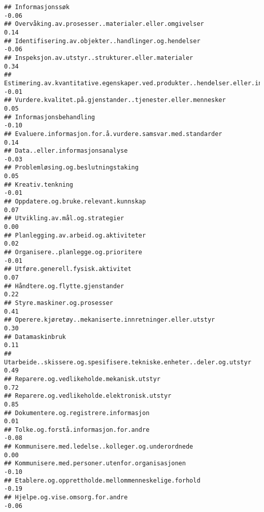 \documentclass[
]{article}
\begin{document}
\begin{verbatim}
## Informasjonssøk                                                                  -0.06
## Overvåking.av.prosesser..materialer.eller.omgivelser                              0.14
## Identifisering.av.objekter..handlinger.og.hendelser                              -0.06
## Inspeksjon.av.utstyr..strukturer.eller.materialer                                 0.34
## Estimering.av.kvantitative.egenskaper.ved.produkter..hendelser.eller.informasjon -0.01
## Vurdere.kvalitet.på.gjenstander..tjenester.eller.mennesker                        0.05
## Informasjonsbehandling                                                           -0.10
## Evaluere.informasjon.for.å.vurdere.samsvar.med.standarder                         0.14
## Data..eller.informasjonsanalyse                                                  -0.03
## Problemløsing.og.beslutningstaking                                                0.05
## Kreativ.tenkning                                                                 -0.01
## Oppdatere.og.bruke.relevant.kunnskap                                              0.07
## Utvikling.av.mål.og.strategier                                                    0.00
## Planlegging.av.arbeid.og.aktiviteter                                              0.02
## Organisere..planlegge.og.prioritere                                              -0.01
## Utføre.generell.fysisk.aktivitet                                                  0.07
## Håndtere.og.flytte.gjenstander                                                    0.22
## Styre.maskiner.og.prosesser                                                       0.41
## Operere.kjøretøy..mekaniserte.innretninger.eller.utstyr                           0.30
## Datamaskinbruk                                                                    0.11
## Utarbeide..skissere.og.spesifisere.tekniske.enheter..deler.og.utstyr              0.49
## Reparere.og.vedlikeholde.mekanisk.utstyr                                          0.72
## Reparere.og.vedlikeholde.elektronisk.utstyr                                       0.85
## Dokumentere.og.registrere.informasjon                                             0.01
## Tolke.og.forstå.informasjon.for.andre                                            -0.08
## Kommunisere.med.ledelse..kolleger.og.underordnede                                 0.00
## Kommunisere.med.personer.utenfor.organisasjonen                                  -0.10
## Etablere.og.opprettholde.mellommenneskelige.forhold                              -0.19
## Hjelpe.og.vise.omsorg.for.andre                                                  -0.06

\end{verbatim}
\end{document}
